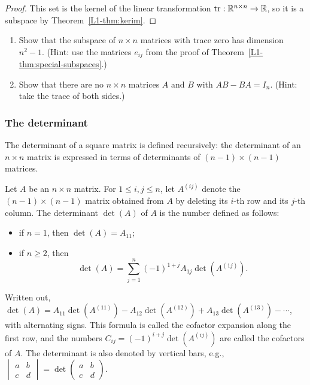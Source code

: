 \begin{proof}
    This set is the kernel of the linear transformation $\operatorname{tr}: \mathbb{R}^{n \times n} \to \mathbb{R}$, so it is a subspace by Theorem~\ref{L1-thm:kerim}.
\end{proof}

\begin{exercise}
    \begin{enumerate}
        \item Show that the subspace of $n \times n$ matrices with trace zero has dimension $n^2 - 1$. (Hint: use the matrices $e_{ij}$ from the proof of Theorem~\ref{L1-thm:special-subspaces}.)
        \item Show that there are no $n \times n$ matrices $A$ and $B$ with $AB - BA = I_n$. (Hint: take the trace of both sides.)
    \end{enumerate}
\end{exercise}

\subsubsection{The determinant}

The determinant of a square matrix is defined recursively: the determinant of an $n \times n$ matrix is expressed in terms of determinants of $(n-1) \times (n-1)$ matrices.

\begin{definition}[Determinant]
    Let $A$ be an $n \times n$ matrix. For $1 \leq i, j \leq n$, let $A^{(ij)}$ denote the $(n-1) \times (n-1)$ matrix obtained from $A$ by deleting its $i$-th row and its $j$-th column. The determinant $\det(A)$ of $A$ is the number defined as follows:
    \begin{itemize}
        \item if $n = 1$, then $\det(A) = A_{11}$;
        \item if $n \geq 2$, then
        \[\det(A) = \sum_{j=1}^n (-1)^{1+j} A_{1j} \det(A^{(1j)}).\]
    \end{itemize}
    Written out, $\det(A) = A_{11} \det(A^{(11)}) - A_{12} \det(A^{(12)}) + A_{13} \det(A^{(13)}) - \cdots$, with alternating signs. This formula is called the cofactor expansion along the first row, and the numbers $C_{ij} = (-1)^{i+j} \det(A^{(ij)})$ are called the cofactors of $A$. The determinant is also denoted by vertical bars, e.g., $\begin{vmatrix} a & b \\ c & d \end{vmatrix} = \det \begin{pmatrix} a & b \\ c & d \end{pmatrix}$.
\end{definition}

